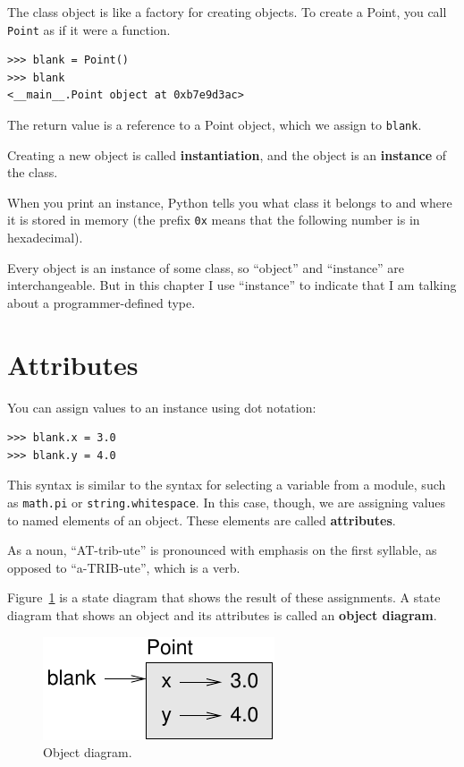 \documentclass[10pt]{book}
\begin{document}
The class object is like a factory for creating objects.  To create a
Point, you call {\tt Point} as if it were a function.

\begin{verbatim}
>>> blank = Point()
>>> blank
<__main__.Point object at 0xb7e9d3ac>
\end{verbatim}
%
The return value is a reference to a Point object, which we
assign to {\tt blank}.  

Creating a new object is called
{\bf instantiation}, and the object is an {\bf instance} of
the class.

When you print an instance, Python tells you what class it
belongs to and where it is stored in memory (the prefix
{\tt 0x} means that the following number is in hexadecimal).

Every object is an instance of some class, so ``object'' and
``instance'' are interchangeable.  But in this chapter I use
``instance'' to indicate that I am talking about a programmer-defined
type.


\section{Attributes}
\label{attributes}

You can assign values to an instance using dot notation:

\begin{verbatim}
>>> blank.x = 3.0
>>> blank.y = 4.0
\end{verbatim}
%
This syntax is similar to the syntax for selecting a variable from a
module, such as {\tt math.pi} or {\tt string.whitespace}.  In this case,
though, we are assigning values to named elements of an object.
These elements are called {\bf attributes}.

As a noun, ``AT-trib-ute'' is pronounced with emphasis on the first
syllable, as opposed to ``a-TRIB-ute'', which is a verb.

Figure~\ref{fig.point} is a state diagram that shows the result of these assignments.
A state diagram that shows an object and its attributes is
called an {\bf object diagram}.

\begin{figure}
\centerline
{\includegraphics[scale=0.8]{figs/point.pdf}}
\caption{Object diagram.}
\label{fig.point}
\end{figure}
\end{document}
